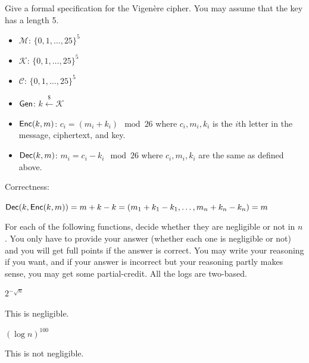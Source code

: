 \documentclass[12pt, letterpaper]{article}
\newcommand{\skcgen}{{\sf Gen}} \newcommand{\skcenc}{{\sf Enc}}
\newcommand{\skcdec}{{\sf Dec}}
\begin{document}
\begin{subproblem}{}
    Give a formal specification for the
      Vigen\`ere cipher\footnotemark. You may assume that the key has a length 5.
    
\end{subproblem}
\begin{solution}
    \begin{itemize}
        \item $\mathcal{M}$: $\{0,1,\dots,25\}^5$
        \item $\mathcal{K}$: $\{0,1,\dots,25\}^5$
        \item $\mathcal{C}$: $\{0,1,\dots,25\}^5$
        \item $\skcgen$: $k \overset{\$}{\leftarrow} \mathcal{K}$
        \item $\skcenc(k,m)$: $c_i = (m_i+k_i) \mod 26$ where $c_i,m_i,k_i$ is the $i$th letter in the message, ciphertext, and key.
        \item $\skcdec(k,m)$: $m_i = c_i-k_i \mod 26$ where $c_i,m_i,k_i$ are the same as defined above.
    \end{itemize}

    Correctness:

    $\skcdec(k,\skcenc(k,m))=m+k-k=(m_1+k_1-k_1,\dots,m_n+k_n-k_n)=m$
\end{solution}

\begin{problem}{}
    For each of the following functions, decide whether they are negligible or not in $n$. You only have to provide your answer (whether each one is negligible or not)
and you will get full points if the answer is correct.
You may write your reasoning if you want, and if your answer
is incorrect but your reasoning partly makes sense, 
you may get some partial-credit.
All the logs are two-based.
\end{problem}
\begin{subproblem}{}
    $2^{-\sqrt{n}}$
\end{subproblem}
\begin{solution}
    This is negligible.
\end{solution}

\begin{subproblem}{}
    $(\log n)^{100}$
\end{subproblem}
\begin{solution}
    This is not negligible.
\end{solution}
\end{document}
